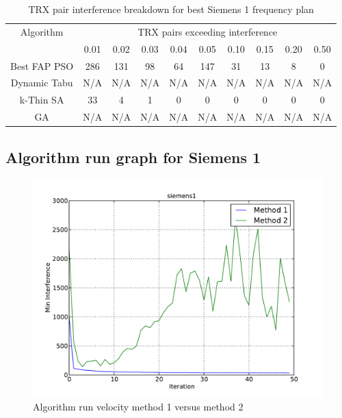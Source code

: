 \begin{table}[H]
\centering
	\begin{tabular}{cccccccccc}
	\toprule
    Algorithm & \multicolumn{9}{c}{TRX pairs exceeding interference}\\
    & 0.01 & 0.02 & 0.03 & 0.04 & 0.05 & 0.10 & 0.15 & 0.20 & 0.50 \\
    \midrule
    Best FAP PSO & 286 & 131 & 98 & 64 & 147 & 31 & 13 & 8 & 0\\
    Dynamic Tabu & \scriptsize{N/A} & \scriptsize{N/A} & \scriptsize{N/A} & \scriptsize{N/A} & \scriptsize{N/A} & \scriptsize{N/A} & \scriptsize{N/A} & \scriptsize{N/A} & \scriptsize{N/A}\\
    k-Thin SA & 33 & 4 & 1 & 0 & 0 & 0 & 0 & 0 & 0 \\
    GA & \scriptsize{N/A} & \scriptsize{N/A} & \scriptsize{N/A} & \scriptsize{N/A} & \scriptsize{N/A} & \scriptsize{N/A} & \scriptsize{N/A} & \scriptsize{N/A} & \scriptsize{N/A}\\
    \bottomrule
	\end{tabular}
\caption{TRX pair interference breakdown for best Siemens 1 frequency plan}
\label{tab:breakdown-siem1m1}
\end{table}

\subsection{Algorithm run graph for Siemens 1}
\begin{figure}[H]
	\begin{centering}
    \includegraphics[scale=0.50]{../Implementation/data-cruncher/graph/Siemens1.pdf}
	\caption{Algorithm run velocity method 1 versus method 2}
	\label{fig:siem1graph}
	\end{centering}
\end{figure}

